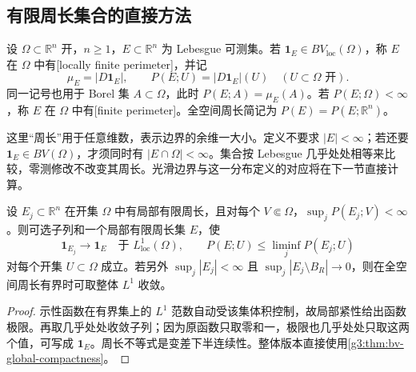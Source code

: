\subsection{有限周长集合的直接方法}
\label{g3:subsec:2102:04}
\begin{definition}\label{g3:def:finite-perimeter-set}
	设 \(\Omega\subset\mathbb R^n\) 开，\(n\ge1\)，\(E\subset\mathbb R^n\) 为 Lebesgue 可测集。若 \(\mathbf1_E\in BV_{\mathrm{loc}}(\Omega)\)，称 \(E\) 在 \(\Omega\) 中有[locally finite perimeter]，并记
	\[
		\mu_E=|D\mathbf1_E|,\qquad
		P(E;U)=|D\mathbf1_E|(U)\quad(U\subset\Omega\text{ 开}).
	\]
	同一记号也用于 Borel 集 \(A\subset\Omega\)，此时 \(P(E;A)=\mu_E(A)\)。若 \(P(E;\Omega)<\infty\)，称 \(E\) 在 \(\Omega\) 中有[finite perimeter]。全空间周长简记为 \(P(E)=P(E;\mathbb R^n)\)。
\end{definition}

这里“周长”用于任意维数，表示边界的余维一大小。定义不要求 \(|E|<\infty\)；若还要 \(\mathbf1_E\in BV(\Omega)\)，才须同时有 \(|E\cap\Omega|<\infty\)。集合按 Lebesgue 几乎处处相等来比较，零测修改不改变其周长。光滑边界与这一分布定义的对应将在下一节直接计算。

\begin{corollary}\label{g3:cor:finite-perimeter-compactness}
	设 \(E_j\subset\mathbb R^n\) 在开集 \(\Omega\) 中有局部有限周长，且对每个 \(V\Subset\Omega\)，\(\sup_jP(E_j;V)<\infty\)。则可选子列和一个局部有限周长集 \(E\)，使
	\[
		\mathbf1_{E_j}\to\mathbf1_E\quad\text{于 }L^1_{\mathrm{loc}}(\Omega),
		\qquad P(E;U)\le\liminf_jP(E_j;U)
	\]
	对每个开集 \(U\subset\Omega\) 成立。若另外 \(\sup_j|E_j|<\infty\) 且
	\(\sup_j|E_j\setminus B_R|\to0\)，则在全空间周长有界时可取整体 \(L^1\) 收敛。
\end{corollary}
\begin{proof}
	示性函数在有界集上的 \(L^1\) 范数自动受该集体积控制，故局部紧性给出函数极限。再取几乎处处收敛子列；因为原函数只取零和一，极限也几乎处处只取这两个值，可写成 \(\mathbf1_E\)。周长不等式是变差下半连续性。整体版本直接使用\cref{g3:thm:bv-global-compactness}。
\end{proof}

